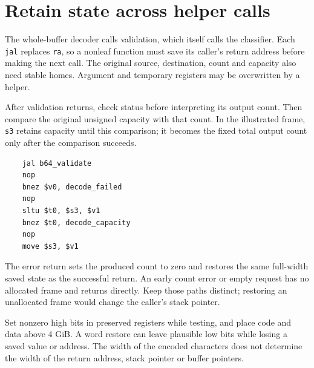 \section{Retain state across helper calls}
The whole-buffer decoder calls validation, which itself calls the classifier. Each
\texttt{jal} replaces \texttt{ra}, so a nonleaf function must save its caller's return
address before making the next call. The original source, destination, count and capacity
also need stable homes. Argument and temporary registers may be overwritten by a helper.

After validation returns, check status before interpreting its output count. Then
compare the original unsigned capacity with that count. In the illustrated frame,
\texttt{s3} retains capacity until this comparison; it becomes the fixed total output
count only after the comparison succeeds.

\begin{verbatim}
    jal b64_validate
    nop
    bnez $v0, decode_failed
    nop
    sltu $t0, $s3, $v1
    bnez $t0, decode_capacity
    nop
    move $s3, $v1
\end{verbatim}

The error return sets the produced count to zero and restores the same full-width
saved state as the successful return. An early count error or empty request has no
allocated frame and returns directly. Keep those paths distinct; restoring an
unallocated frame would change the caller's stack pointer.

Set nonzero high bits in preserved registers while testing, and place code and data
above 4 GiB. A word restore can leave plausible low bits while losing a saved value
or address. The width of the encoded characters does not determine the width of the
return address, stack pointer or buffer pointers.
